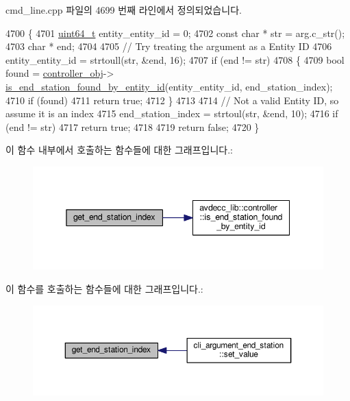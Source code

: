 cmd\+\_\+line.\+cpp 파일의 4699 번째 라인에서 정의되었습니다.


\begin{DoxyCode}
4700 \{
4701     \hyperlink{parse_8c_aec6fcb673ff035718c238c8c9d544c47}{uint64\_t} entity\_entity\_id = 0;
4702     \textcolor{keyword}{const} \textcolor{keywordtype}{char} * str = arg.c\_str();
4703     \textcolor{keywordtype}{char} * end;
4704 
4705     \textcolor{comment}{// Try treating the argument as a Entity ID}
4706     entity\_entity\_id = strtoull(str, &end, 16);
4707     \textcolor{keywordflow}{if} (end != str)
4708     \{
4709         \textcolor{keywordtype}{bool} found = \hyperlink{classcmd__line_af0a7784509e5bf1210a2aa19cea5df70}{controller\_obj}->
      \hyperlink{classavdecc__lib_1_1controller_a4d07245e54460e0656f7a11bbeaec275}{is\_end\_station\_found\_by\_entity\_id}(entity\_entity\_id, end\_station\_index);
4710         \textcolor{keywordflow}{if} (found)
4711             \textcolor{keywordflow}{return} \textcolor{keyword}{true};
4712     \}
4713 
4714     \textcolor{comment}{// Not a valid Entity ID, so assume it is an index}
4715     end\_station\_index = strtoul(str, &end, 10);
4716     \textcolor{keywordflow}{if} (end != str)
4717         \textcolor{keywordflow}{return} \textcolor{keyword}{true};
4718 
4719     \textcolor{keywordflow}{return} \textcolor{keyword}{false};
4720 \}
\end{DoxyCode}


이 함수 내부에서 호출하는 함수들에 대한 그래프입니다.\+:
\nopagebreak
\begin{figure}[H]
\begin{center}
\leavevmode
\includegraphics[width=345pt]{classcmd__line_a84930ee2ce89caaf47c2e4b122510d0e_cgraph}
\end{center}
\end{figure}




이 함수를 호출하는 함수들에 대한 그래프입니다.\+:
\nopagebreak
\begin{figure}[H]
\begin{center}
\leavevmode
\includegraphics[width=350pt]{classcmd__line_a84930ee2ce89caaf47c2e4b122510d0e_icgraph}
\end{center}
\end{figure}


